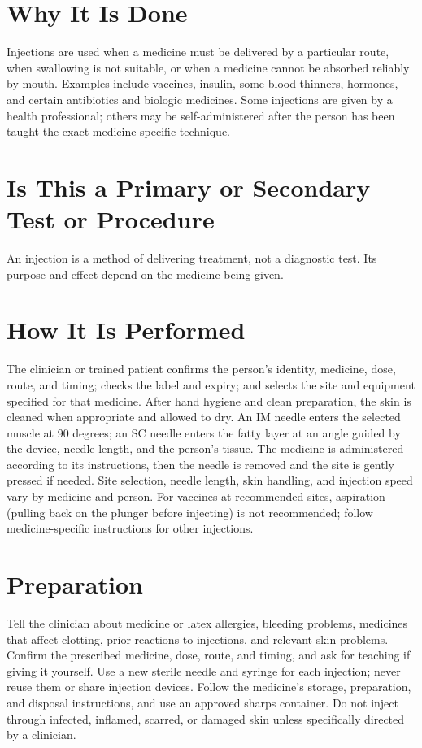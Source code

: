 \section*{Why It Is Done}
Injections are used when a medicine must be delivered by a particular route, when swallowing is not suitable, or when a medicine cannot be absorbed reliably by mouth. Examples include vaccines, insulin, some blood thinners, hormones, and certain antibiotics and biologic medicines. Some injections are given by a health professional; others may be self-administered after the person has been taught the exact medicine-specific technique.

\section*{Is This a Primary or Secondary Test or Procedure}
An injection is a method of delivering treatment, not a diagnostic test. Its purpose and effect depend on the medicine being given.

\section*{How It Is Performed}
The clinician or trained patient confirms the person's identity, medicine, dose, route, and timing; checks the label and expiry; and selects the site and equipment specified for that medicine. After hand hygiene and clean preparation, the skin is cleaned when appropriate and allowed to dry. An IM needle enters the selected muscle at 90 degrees; an SC needle enters the fatty layer at an angle guided by the device, needle length, and the person's tissue. The medicine is administered according to its instructions, then the needle is removed and the site is gently pressed if needed. Site selection, needle length, skin handling, and injection speed vary by medicine and person. For vaccines at recommended sites, aspiration (pulling back on the plunger before injecting) is not recommended; follow medicine-specific instructions for other injections.

\section*{Preparation}
Tell the clinician about medicine or latex allergies, bleeding problems, medicines that affect clotting, prior reactions to injections, and relevant skin problems. Confirm the prescribed medicine, dose, route, and timing, and ask for teaching if giving it yourself. Use a new sterile needle and syringe for each injection; never reuse them or share injection devices. Follow the medicine's storage, preparation, and disposal instructions, and use an approved sharps container. Do not inject through infected, inflamed, scarred, or damaged skin unless specifically directed by a clinician.

